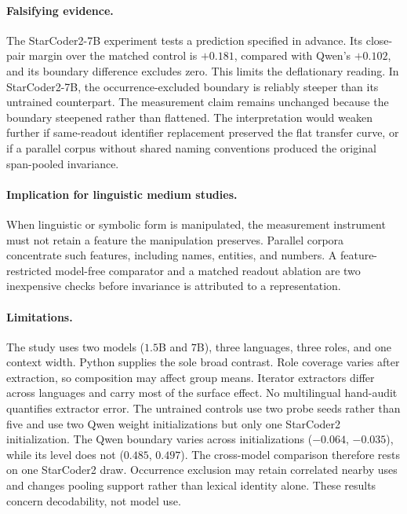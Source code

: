 \documentclass{article}
\begin{document}
\paragraph{Falsifying evidence.} The StarCoder2-7B experiment tests a
prediction specified in advance. Its close-pair margin over the matched
control is $+0.181$, compared with Qwen's $+0.102$, and its boundary difference
excludes zero. This limits the deflationary reading. In StarCoder2-7B, the
occurrence-excluded boundary is reliably steeper than its untrained
counterpart. The measurement claim remains unchanged because the boundary
steepened rather than flattened. The interpretation would weaken
further if same-readout identifier replacement preserved the flat transfer
curve, or if a parallel corpus without shared naming conventions produced the
original span-pooled invariance.

\paragraph{Implication for linguistic medium studies.}
When linguistic or symbolic form is manipulated, the measurement instrument
must not retain a feature the manipulation preserves. Parallel corpora
concentrate such features, including names, entities, and numbers. A feature-restricted
model-free comparator and a matched readout ablation are two inexpensive
checks before invariance is attributed to a representation.

\paragraph{Limitations.}
The study uses two models ($1.5$B and $7$B), three languages, three roles,
and one context width. Python supplies the sole broad contrast. Role coverage
varies after extraction, so composition may affect group means. Iterator
extractors differ across languages and carry most of the surface effect. No
multilingual hand-audit quantifies extractor error. The untrained controls use
two probe seeds rather than five and use two Qwen weight initializations but
only one StarCoder2 initialization. The Qwen boundary varies across
initializations ($-0.064$, $-0.035$), while its level does not ($0.485$,
$0.497$). The cross-model comparison therefore rests on one StarCoder2 draw.
Occurrence exclusion may retain correlated nearby uses and changes pooling
support rather than lexical identity alone. These results concern decodability,
not model use.



\end{document}
